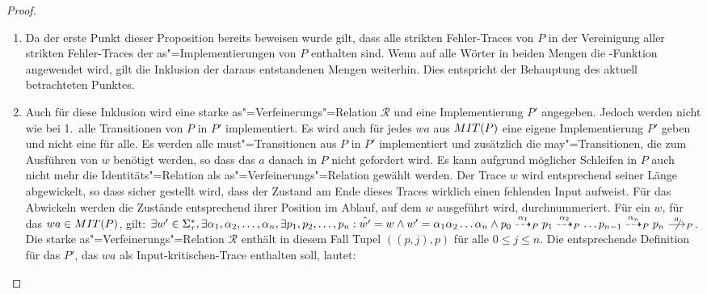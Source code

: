 \begin{proof}
\begin{enumerate}
    \item Da der erste Punkt dieser Proposition bereits beweisen wurde gilt,
      dass alle strikten Fehler-Traces von $P$ in der Vereinigung aller
      strikten Fehler-Traces der as"=Implementierungen von $P$ enthalten sind.
      Wenn auf alle Wörter in beiden Mengen die \prune{}-Funktion angewendet
      wird, gilt die Inklusion der daraus entstandenen Mengen weiterhin. Dies
      entspricht der Behauptung des aktuell betrachteten Punktes.
    \item Auch für diese Inklusion wird eine starke as"=Verfeinerungs"=Relation
      $\mathcal{R}$ und eine Implementierung $P'$ angegeben. Jedoch werden
      nicht wie bei 1.\ alle Transitionen von $P$ in $P'$ implementiert. Es
      wird auch für jedes $wa$ aus $MIT (P)$ eine eigene Implementierung $P'$
      geben und nicht eine für alle. Es werden alle must"=Transitionen aus $P$
      in $P'$ implementiert und zusätzlich die may"=Transitionen, die zum
      Ausführen von $w$ benötigt werden, so dass das $a$ danach in $P$ nicht
      gefordert wird. Es kann aufgrund möglicher Schleifen in $P$ auch nicht
      mehr die Identitäts"=Relation als as"=Verfeinerungs"=Relation gewählt
      werden. Der Trace $w$ wird entsprechend seiner Länge abgewickelt, so dass
      sicher gestellt wird, dass der Zustand am Ende dieses Traces wirklich
      einen fehlenden Input aufweist. Für das Abwickeln werden die Zustände
      entsprechend ihrer Position im Ablauf, auf dem $w$ ausgeführt wird,
      durchnummeriert. Für ein $w$, für das $wa\in MIT (P)$, gilt: $\exists
      w'\in\Sigma _{\tau} ^*, \exists \alpha _1,\alpha _2,\dots ,\alpha _n,
      \exists p_1,p_2,\dots ,p_n: \hat{w'} = w\land w'=\alpha _1\alpha _2\dots
      \alpha _n\land p_0 \may[\alpha _1]_P p_1 \may[\alpha _2]_P \dots
      p_{n-1}\may[\alpha _n]_P p_n \nmust[a]_P$.
      Die starke as"=Verfeinerungs"=Relation $\mathcal{R}$ enthält in diesem
      Fall Tupel $((p,j),p)$ für alle $0\leq j \leq n$. Die entsprechende
      Definition für das $P'$, das $wa$ als Input-kritischen-Trace enthalten
      soll, lautet:
\end{enumerate}
\end{proof}
